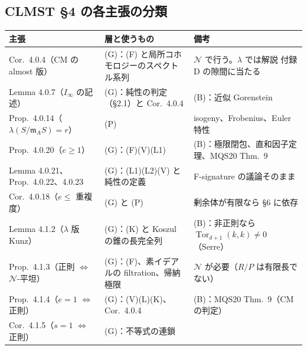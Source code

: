 \documentclass[11pt,a4paper]{ltjsarticle}
\theoremstyle{plain}
\theoremstyle{definition}
\theoremstyle{remark}
\theoremstyle{plain}
\newcommand{\m}{\mathfrak{m}}
\newcommand{\Tor}{\operatorname{Tor}}
\begin{document}
\subsection{CLMST \S 4 の各主張の分類}
\begin{center}
\small
\begin{tabularx}{\textwidth}{>{\raggedright}p{3.2cm}>{\raggedright}X>{\raggedright\arraybackslash}p{3.6cm}}
\toprule
主張 & 層と使うもの & 備考 \\
\midrule
Cor.~4.0.4（CM の almost 版） & (G)：(F) と局所コホモロジーのスペクトル系列 & $\mathcal{N}$ で行う。$\lambda$ では解説 付録 D の隙間に当たる \\
Lemma 4.0.7（$I_\infty$ の記述） & (G)：純性の判定（\S 2.1）と Cor.~4.0.4 & (B)：近似 Gorenstein \\
Prop.~4.0.14（$\lambda(S/\m_A S) = r$） & (P) & isogeny、Frobenius、Euler 特性 \\
Prop.~4.0.20（$e\ge1$） & (G)：(F)(V)(L1) & (B)：極限閉包、直和因子定理、MQS20 Thm.~9 \\
Lemma 4.0.21、Prop.~4.0.22、4.0.23 & (G)：(L1)(L2)(V) と純性の定義 & F-signature の議論そのまま \\
Cor.~4.0.18（$e\le$ 重複度） & (G) と (P) & 剰余体が有限なら \S 6 に依存 \\
Lemma 4.1.2（$\lambda$ 版 Kunz） & (G)：(K) と Koszul の錐の長完全列 & (B)：非正則なら $\Tor_{d+1}(k,k)\ne0$（Serre）\\
Prop.~4.1.3（正則 $\Leftrightarrow$ $\mathcal{N}$-平坦） & (G)：(F)、素イデアルの filtration、帰納極限 & $\mathcal{N}$ が必要（$R/P$ は有限長でない） \\
Prop.~4.1.4（$e = 1$ $\Leftrightarrow$ 正則） & (G)：(V)(L)(K)、Cor.~4.0.4 & (B)：MQS20 Thm.~9（CM の判定） \\
Cor.~4.1.5（$s = 1$ $\Leftrightarrow$ 正則） & (G)：不等式の連鎖 & \\
\bottomrule
\end{tabularx}
\end{center}
\end{document}
